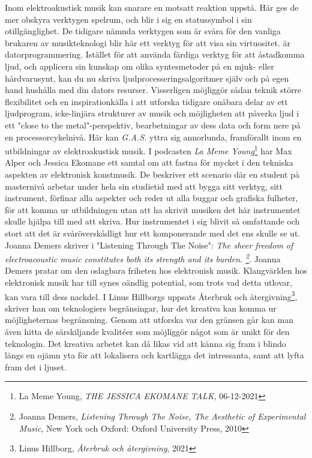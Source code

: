 \documentclass{article}
\begin{document}


Inom elektroakustisk musik kan snarare en motsatt reaktion uppstå. Här ges de mer obskyra verktygen spelrum,
och blir i sig en statussymbol i sin otillgänglighet. De tidigare nämnda verktygen som är svåra för den
vanliga brukaren av musikteknologi blir här ett verktyg för att visa sin virtuositet. 
är datorprogrammering. 
Istället för att använda färdiga verktyg för att åstadkomma ljud, och applicera sin kunskap om olika
syntesmetoder på en mjuk- eller hårdvarusynt, kan du nu skriva ljudprocesseringsalgoritmer själv och på egen
hand hushålla med din dators resurser. Visserligen möjliggör sådan teknik större flexibilitet och en
inspirationkälla i att utforska tidigare onåbara delar av ett ljudprogram, icke-linjära strukturer av musik
och möjligheten att påverka ljud i ett "close to the metal"-perspektiv, bearbetningar av dess data och form
nere på en processorcykelnivå. Här kan \emph{G.A.S.} yttra sig annorlunda, framförallt inom en utbildningar av
elektroakustisk musik. I podcasten \emph{La Meme Young}\footnote{La Meme Young, \emph{THE JESSICA EKOMANE
TALK}, 06-12-2021} har Max Alper och Jessica Ekomane ett samtal om att
fastna för mycket i den tekniska aspekten av elektronisk konstmusik. De beskriver ett scenario där en student
på masternivå arbetar under hela sin studietid med att bygga sitt verktyg, sitt instrument, förfinar alla
aspekter och reder
ut alla buggar och grafiska fulheter, för att komma ur utbildningen utan att ha skrivit
musiken det här instrumentet skulle hjälpa till med att skriva. Hur instrumentet i sig blivit så omfattande
och stort att det är svåröverskådligt hur ett komponerande med det ens skulle se ut. 
Joanna Demers skriver i "Listening Through The Noise": \emph{
The sheer freedom of electroacoustic music constitutes both its strength and its burden. \footnote{Joanna Demers, \emph{Listening Through The Noise, The Aesthetic of Experimental Music}, New York och Oxford: Oxford University Press, 2010}}.
Joanna Demers pratar om den oslagbara friheten hos elektronisk musik. Klangvärlden hos elektronisk musik har
till synes oändlig potential, som trots vad detta utlovar, kan vara till dess nackdel. I Linus Hillborgs uppsats
Återbruk och återgivning\footnote{Linus Hillborg, \emph{Återbruk och återgivning}, 2021}, skriver han om teknologiers begränsingar, hur det kreativa
kan komma ur möjligheternas begränsning. Genom att utforska var den gränsen går kan man även hitta de
särskiljande kvalitéer som möjliggör något som är unikt för den teknologin. Det kreativa arbetet kan då likas
vid att känna sig fram i blindo längs en ojämn yta för att lokalisera och kartlägga det intressanta, samt att
lyfta fram det i ljuset. 
\end{document}
